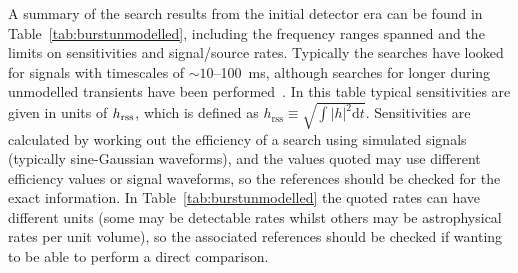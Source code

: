 A summary of the search results from the initial detector era can be found in 
Table~\ref{tab:burstunmodelled}, including the frequency ranges spanned and the limits on sensitivities and signal/source rates.
Typically the searches have looked for signals with timescales of $\sim 10$--100~ms, although searches for longer during unmodelled
transients have been performed~\cite{2016PhRvD..93d2005A}. In this table typical sensitivities are 
given in units of $h_{\rm rss}$, 
which is defined as $h_{\mathrm{rss}} \equiv \sqrt{\int|h|^2 \mathrm{d}t}$. Sensitivities are calculated 
by working out the efficiency of a search using simulated signals (typically sine-Gaussian waveforms), and the 
values quoted may use different efficiency values or signal waveforms, so the references should be checked for 
the exact information. In Table~\ref{tab:burstunmodelled} the quoted rates can have different units (some may be 
detectable rates whilst others may be astrophysical rates per unit volume), so the associated references 
should be checked if wanting to be able to perform a direct comparison.

